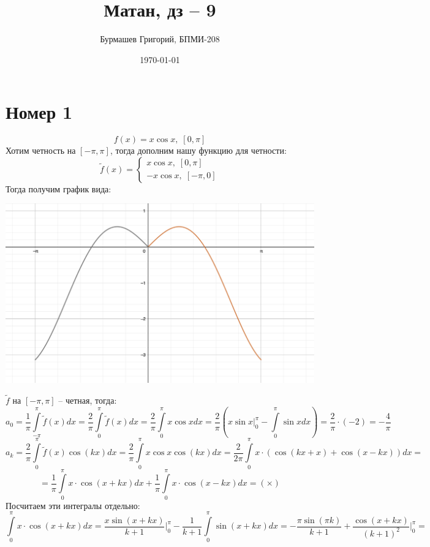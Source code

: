 \documentclass[a4paper,12pt]{article}
\author{Бурмашев Григорий, БПМИ-208}
\title{Матан, дз -- 9}
\date{\today}
\begin{document}
\maketitle
\clearpage
\section*{Номер 1}
\[
f(x) = x \cos x, \; [0, \pi ]
\]
Хотим четность на $[-\pi, \pi]$, тогда дополним нашу функцию для четности:
\[
\tilde{f}(x) = 
\begin{cases}
x \cos x, \; [0, \pi ] \\ 
-x \cos x, \; [-\pi, 0] 
\end{cases}
\]
Тогда получим график вида:
\begin{center}
\includegraphics[scale=0.3]{1.png}
\end{center}
$\tilde{f}$ на $[-\pi, \pi]$ -- четная, тогда:
\[
a_0 = \frac{1}{\pi} \int\limits_{-\pi}^{\pi} \tilde{f}(x) dx  = \frac{2}{\pi} \int\limits_{0}^{\pi} \tilde{f}(x) dx =  \frac{2}{\pi} \int\limits_{0}^{\pi} x \cos x dx = \frac{2}{\pi} \left(
x \sin x \Bigg|_0^{\pi} - \int\limits_0^{\pi} \sin x dx
\right) = \frac{2}{\pi} \cdot (-2)  = - \frac{4}{\pi}
\]
\[
a_k = \frac{2}{\pi} \int\limits_{0}^{\pi} \tilde{f}(x) \cos  (kx)  dx  = \frac{2}{\pi} \int\limits_{0}^{\pi} x \cos x\cos  (kx)  dx = \frac{2}{2\pi} \int\limits_{0}^{\pi} x \cdot \left( \cos(kx + x)  + \cos(x - kx) \right) dx  = 
\]
\[
= \frac{1}{\pi} \int\limits_0^{\pi} x \cdot \cos (x + kx) dx + \frac{1}{\pi} \int\limits_0^{\pi} x \cdot \cos (x - kx) dx  = (\times)
\]
Посчитаем эти интегралы отдельно:
\[
\int\limits_0^{\pi} x \cdot \cos (x + kx) dx = \frac{x \sin (x + kx)}{k + 1} \Bigg|_0^{\pi} - \frac{1}{k + 1} \int\limits_0^{\pi} \sin (x + kx) dx  = -\frac{\pi \sin (\pi k)}{k + 1} + \frac{\cos (x + kx)}{(k+1)^2} \Bigg|_0^{\pi} = 
\]
\end{document}
